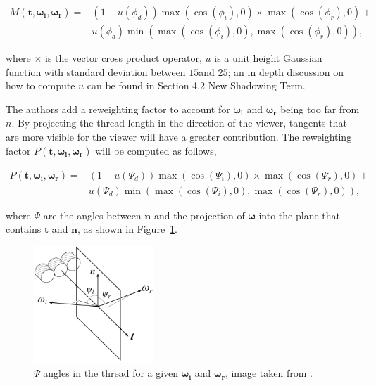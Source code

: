 \documentclass[12pt]{article}
\newcommand{\omegai}{\boldsymbol{\omega_i}}
\newcommand{\omegar}{\boldsymbol{\omega_r}}
\newcommand{\tb}{\mathbf{t}}
\begin{document}
\begin{equation}
\begin{split}
M(\tb, \omegai, \omegar) =& (1 - u(\phi_d)) \max(\cos(\phi_i), 0) \times \max(\cos(\phi_r), 0) + \\
& u(\phi_d) \min( \max(\cos(\phi_i), 0), \max(\cos(\phi_r), 0) ),
\end{split}
\end{equation}

where $\times$ is the vector cross product operator, $u$ is a unit height Gaussian function with standard deviation between $15$\textdegree and $25$\textdegree; an in depth discussion on how to compute $u$ can be found in \citeauthor{Ashikmin2000} \cite{Ashikmin2000} Section 4.2 New Shadowing Term.

The authors add a reweighting factor to account for $\omegai$ and $\omegar$ being too far from $n$.
By projecting the thread length in the direction of the viewer, tangents that are more visible for the viewer will have a greater contribution.
The reweighting factor $P(\tb, \omegai, \omegar)$ will be computed as follows,

\begin{equation}
\begin{split}
P(\tb, \omegai, \omegar) =& (1 - u(\Psi_d)) \max(\cos(\Psi_i), 0) \times \max(\cos(\Psi_r), 0) + \\
& u(\Psi_d) \min( \max(\cos(\Psi_i), 0), \max(\cos(\Psi_r), 0) ),
\end{split}
\end{equation}

where $\Psi$ are the angles between $\mathbf{n}$ and the projection of $\boldsymbol{\omega}$ into the plane that contains $\tb$ and $\mathbf{n}$, as shown in Figure~\ref{fig:psi_thread_angles}.

\begin{figure}[htbp!]
\centering
\includegraphics[width=0.4\textwidth]{images/psi_thread_angles}
	\caption{$\Psi$ angles in the thread for a given $\omegai$ and $\omegar$, image taken from \cite{Sadeghi2013}.}
	\label{fig:psi_thread_angles}
\end{figure}
\end{document}
